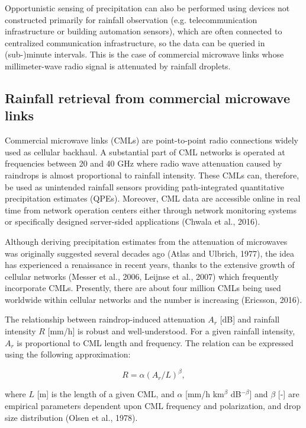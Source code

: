 \documentclass{ctuthesis}\usepackage[]{graphicx}\usepackage[]{color}
\begin{document}
Opportunistic sensing of precipitation can also be performed using devices not constructed primarily for rainfall observation (e.g. telecommunication infrastructure or building automation sensors), which are often connected to centralized communication infrastructure, so the data can be queried in (sub-)minute intervals. This is the case of commercial microwave links whose millimeter-wave radio signal is attenuated by rainfall droplets.


\subsection{Rainfall retrieval from commercial microwave links}

Commercial microwave links (CMLs) are point-to-point radio connections widely used as cellular backhaul. A substantial part of CML networks is operated at frequencies between 20 and 40 GHz where radio wave attenuation caused by raindrops is almost proportional to rainfall intensity. These CMLs can, therefore, be used as unintended rainfall sensors providing path-integrated quantitative precipitation estimates (QPEs). Moreover, CML data are accessible online in real time from network operation centers either through network monitoring systems or specifically designed server-sided applications (Chwala et al., 2016).

Although deriving precipitation estimates from the attenuation of microwaves was originally suggested several decades ago (Atlas and Ulbrich, 1977), the idea has experienced a renaissance in recent years, thanks to the extensive growth of cellular networks (Messer et al., 2006, Leijnse et al., 2007) which frequently incorporate CMLs. Presently, there are about four million CMLs being used worldwide within cellular networks and the number is increasing (Ericsson, 2016).

The relationship between raindrop-induced attenuation $A_r$ [dB] and rainfall intensity $R$ [mm/h] is robust and well-understood. For a given rainfall intensity, $A_r$ is proportional to CML length and frequency. The relation can be expressed using the following approximation: 

\begin{equation} \label{2eq1}
R = \alpha (A_r / L)^\beta,
\end{equation}


where $L$ [m] is the length of a given CML, and $\alpha$ [mm/h km$^\beta$ dB$^{-\beta}$] and $\beta$ [-] are empirical parameters dependent upon CML frequency and polarization, and drop size distribution (Olsen et al., 1978).
\end{document}
